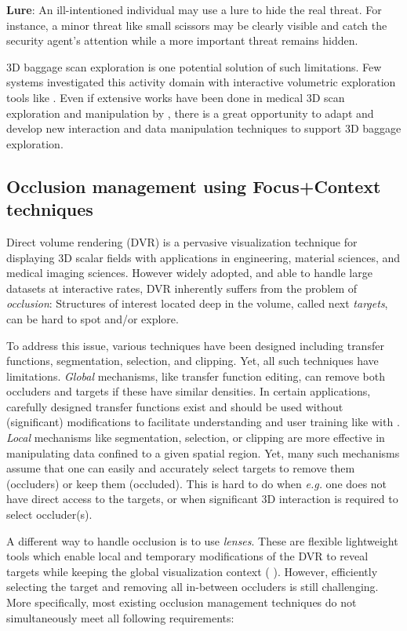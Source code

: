 \textbf{Lure}: An ill-intentioned individual may use a lure to hide the real threat. For instance, a minor threat like small scissors may be clearly visible and catch the security agent's attention while a more important threat remains hidden.


3D baggage scan exploration is one potential solution of such limitations. Few systems investigated this activity domain with interactive volumetric exploration tools like \cite{Li:2012:LVV:2425296.2425325}. Even if extensive works have been done in medical 3D scan exploration and manipulation by \cite{preim2013visual}, there is a great opportunity to adapt and develop new interaction and data manipulation techniques to support 3D baggage exploration.
 
 
 \subsection{Occlusion management using Focus+Context techniques}
 \label{introreq}
 
 Direct volume rendering (DVR) is a pervasive visualization technique for displaying 3D scalar fields with applications in engineering, material sciences, and medical imaging sciences. However widely adopted, and able to handle large datasets at interactive rates, DVR inherently suffers from the problem of \emph{occlusion}: Structures of interest located deep in the volume, called next \emph{targets}, can be hard to spot and/or explore.


To address this issue, various techniques have been designed including transfer functions, segmentation, selection, and clipping. Yet, all such techniques have limitations.  \emph{Global} mechanisms, like transfer function editing, can remove both occluders and targets if these have similar densities. In certain applications, carefully designed transfer functions exist and should be used without (significant) modifications to facilitate understanding and user training like with \cite{4276082}. \emph{Local} mechanisms like segmentation, selection, or clipping are more effective in manipulating data confined to a given spatial region. Yet, many such mechanisms assume that one can easily and accurately select targets to remove them (occluders) or keep them (occluded). This is hard to do when \emph{e.g.} one does not have direct access to the targets, or when significant 3D interaction is required to select occluder(s).


A different way to handle occlusion is to use \emph{lenses}. These are flexible lightweight tools which enable local and temporary modifications of the DVR to reveal targets while keeping the global visualization context ( \cite{595268,CGF:CGF12871,6327262} ). However, efficiently selecting the target and removing all in-between occluders is still challenging. More specifically, most existing occlusion management techniques do not simultaneously meet all following requirements: 


